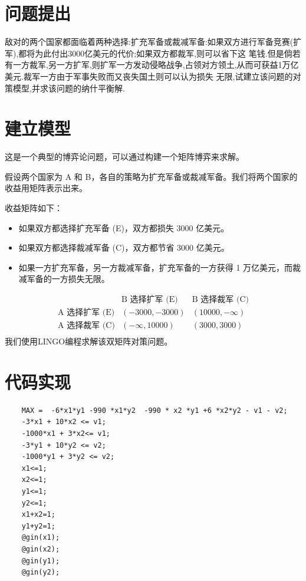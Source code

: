 \documentclass[12pt, a4paper, oneside]{ctexart}
\begin{document}
\section*{问题提出}
敌对的两个国家都面临着两种选择:扩充军备或裁减军备:如果双方进行军备竞赛(扩军),都将为此付出3000亿美元的代价;如果双方都裁军,则可以省下这
笔钱.但是倘若有一方裁军,另一方扩军,则扩军一方发动侵略战争,占领对方领土,从而可获益1万亿美元.裁军一方由于军事失败而又丧失国土则可以认为损失
无限,试建立该问题的对策模型,并求该问题的纳什平衡解.

\section*{建立模型}
这是一个典型的博弈论问题，可以通过构建一个矩阵博弈来求解。

假设两个国家为 A 和 B，各自的策略为扩充军备或裁减军备。我们将两个国家的收益用矩阵表示出来。

收益矩阵如下：

\begin{itemize}
    \item 如果双方都选择扩充军备 (E)，双方都损失 3000 亿美元。
    \item 如果双方都选择裁减军备 (C)，双方都节省 3000 亿美元。
    \item 如果一方扩充军备，另一方裁减军备，扩充军备的一方获得 1 万亿美元，而裁减军备的一方损失无限。
\end{itemize}

\[
\begin{array}{c|c|c}
    & \text{B 选择扩军 (E)} & \text{B 选择裁军 (C)} \\
    \hline
    \text{A 选择扩军 (E)} & (-3000, -3000) & (10000, -\infty) \\
    \hline
    \text{A 选择裁军 (C)} & (-\infty, 10000) & (3000, 3000) \\
\end{array}
\]
我们使用LINGO编程求解该双矩阵对策问题。
\section*{代码实现}
\begin{verbatim}
    MAX =  -6*x1*y1 -990 *x1*y2  -990 * x2 *y1 +6 *x2*y2 - v1 - v2;
    -3*x1 + 10*x2 <= v1;
    -1000*x1 + 3*x2<= v1;
    -3*y1 + 10*y2 <= v2;
    -1000*y1 + 3*y2 <= v2;
    x1<=1;
    x2<=1;
    y1<=1;
    y2<=1;
    x1+x2=1;
    y1+y2=1;
    @gin(x1);
    @gin(x2);
    @gin(y1);
    @gin(y2);
\end{verbatim}
\end{document}
